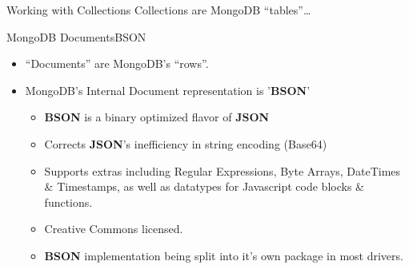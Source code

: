 \documentclass{beamer}
\begin{document}
\begin{frame}{Working with Collections}
    Collections are MongoDB ``tables''\dots
    \pause
\end{frame}

\begin{frame}{MongoDB Documents}{BSON}
    \begin{itemize}
        \item ``Documents'' are MongoDB's ``rows''. 
        \item MongoDB's Internal Document representation is '{\bf BSON}'
        \begin{itemize}
            \item {\bf BSON} is a binary optimized flavor of {\bf JSON}
            \item Corrects {\bf JSON}'s inefficiency in string encoding (Base64)
            \item Supports extras including Regular Expressions, Byte Arrays, DateTimes \& Timestamps, as well as datatypes for Javascript code blocks \& functions.
            \item Creative Commons licensed.
            \item {\bf BSON} implementation being split into it's own package in most drivers.
        \end{itemize}
    \end{itemize}
\end{frame}
\end{document}
